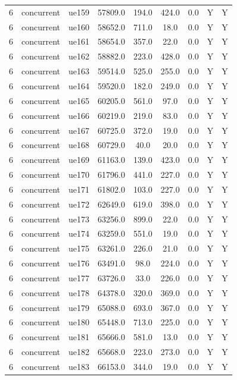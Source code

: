 \begin{table}[ht]
\begin{tabular}{|c|c|c|c|c|c|c|c|c|}
6 & concurrent & ue159 & 57809.0 & 194.0 & 424.0 & 0.0 & Y & Y \\
6 & concurrent & ue160 & 58652.0 & 711.0 & 18.0 & 0.0 & Y & Y \\
6 & concurrent & ue161 & 58654.0 & 357.0 & 22.0 & 0.0 & Y & Y \\
6 & concurrent & ue162 & 58882.0 & 223.0 & 428.0 & 0.0 & Y & Y \\
6 & concurrent & ue163 & 59514.0 & 525.0 & 255.0 & 0.0 & Y & Y \\
6 & concurrent & ue164 & 59520.0 & 182.0 & 249.0 & 0.0 & Y & Y \\
6 & concurrent & ue165 & 60205.0 & 561.0 & 97.0 & 0.0 & Y & Y \\
6 & concurrent & ue166 & 60219.0 & 219.0 & 83.0 & 0.0 & Y & Y \\
6 & concurrent & ue167 & 60725.0 & 372.0 & 19.0 & 0.0 & Y & Y \\
6 & concurrent & ue168 & 60729.0 & 40.0 & 20.0 & 0.0 & Y & Y \\
6 & concurrent & ue169 & 61163.0 & 139.0 & 423.0 & 0.0 & Y & Y \\
6 & concurrent & ue170 & 61796.0 & 441.0 & 227.0 & 0.0 & Y & Y \\
6 & concurrent & ue171 & 61802.0 & 103.0 & 227.0 & 0.0 & Y & Y \\
6 & concurrent & ue172 & 62649.0 & 619.0 & 398.0 & 0.0 & Y & Y \\
6 & concurrent & ue173 & 63256.0 & 899.0 & 22.0 & 0.0 & Y & Y \\
6 & concurrent & ue174 & 63259.0 & 551.0 & 19.0 & 0.0 & Y & Y \\
6 & concurrent & ue175 & 63261.0 & 226.0 & 21.0 & 0.0 & Y & Y \\
6 & concurrent & ue176 & 63491.0 & 98.0 & 224.0 & 0.0 & Y & Y \\
6 & concurrent & ue177 & 63726.0 & 33.0 & 226.0 & 0.0 & Y & Y \\
6 & concurrent & ue178 & 64378.0 & 320.0 & 369.0 & 0.0 & Y & Y \\
6 & concurrent & ue179 & 65088.0 & 693.0 & 367.0 & 0.0 & Y & Y \\
6 & concurrent & ue180 & 65448.0 & 713.0 & 225.0 & 0.0 & Y & Y \\
6 & concurrent & ue181 & 65666.0 & 581.0 & 13.0 & 0.0 & Y & Y \\
6 & concurrent & ue182 & 65668.0 & 223.0 & 273.0 & 0.0 & Y & Y \\
6 & concurrent & ue183 & 66153.0 & 344.0 & 19.0 & 0.0 & Y & Y \\

\end{tabular}
\end{table}
